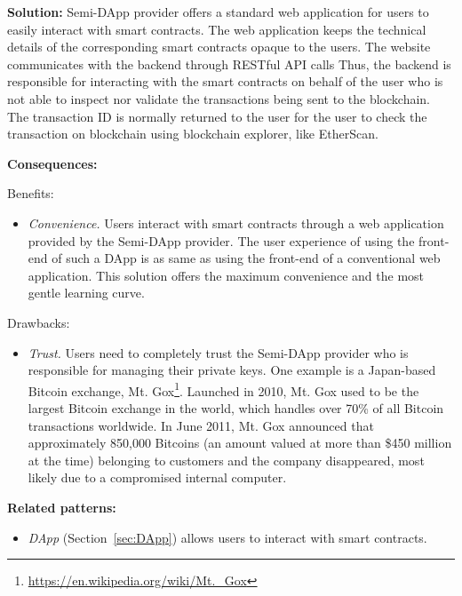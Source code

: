 \vspace{0.5em}\noindent \textbf{Solution:} 
Semi-DApp provider offers a standard web application for users to easily interact with smart contracts. The web application keeps the technical details of the corresponding smart contracts opaque to the users. The website communicates with the backend through RESTful API calls%
Thus, the backend is responsible for interacting with the smart contracts on behalf of the user who is not able to inspect nor validate the transactions being sent to the blockchain. The transaction ID is normally returned to the user for the user to check the transaction on blockchain using blockchain explorer, like EtherScan.


\vspace{0.5em}\noindent \textbf{Consequences:} 

Benefits:
\begin{itemize}
  \item \textit{Convenience.} Users interact with smart contracts through a web application provided by the Semi-DApp provider. The user experience of using the front-end of such a DApp is as same as using the front-end of a conventional web application. This solution offers the maximum convenience and the most gentle learning curve. 
\end{itemize}


Drawbacks: 
\begin{itemize}
   \item \textit{Trust.} Users need to completely trust the Semi-DApp provider who is responsible for managing their private keys. One example is a Japan-based Bitcoin exchange, Mt. Gox\footnote{\url{https://en.wikipedia.org/wiki/Mt._Gox}}. Launched in 2010,  Mt. Gox used to be the largest Bitcoin exchange in the world, which handles over 70\% of all Bitcoin transactions worldwide. In June 2011, Mt. Gox announced that approximately 850,000 Bitcoins (an amount valued at more than \$450 million at the time) belonging to customers and the company disappeared, most likely due to a compromised internal computer. %
\end{itemize}


\vspace{0.5em}\noindent \textbf{Related patterns:} 
\begin{itemize}
    \item \textit{DApp} (Section~\ref{sec:DApp}) allows users to interact with smart contracts.
\end{itemize}


